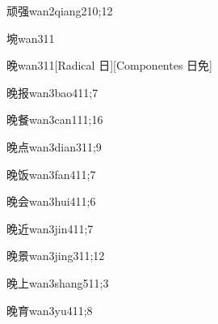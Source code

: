 \begin{verbete}{顽强}{wan2qiang2}{10;12}
\end{verbete}

\begin{verbete}{埦}{wan3}{11}
\end{verbete}

\begin{verbete}{晚}{wan3}{11}[Radical 日][Componentes 日免]
\end{verbete}

\begin{verbete}{晚报}{wan3bao4}{11;7}
\end{verbete}

\begin{verbete}{晚餐}{wan3can1}{11;16}
\end{verbete}

\begin{verbete}{晚点}{wan3dian3}{11;9}
\end{verbete}

\begin{verbete}{晚饭}{wan3fan4}{11;7}
\end{verbete}

\begin{verbete}{晚会}{wan3hui4}{11;6}
\end{verbete}

\begin{verbete}{晚近}{wan3jin4}{11;7}
\end{verbete}

\begin{verbete}{晚景}{wan3jing3}{11;12}
\end{verbete}

\begin{verbete}{晚上}{wan3shang5}{11;3}
\end{verbete}

\begin{verbete}{晚育}{wan3yu4}{11;8}
\end{verbete}

